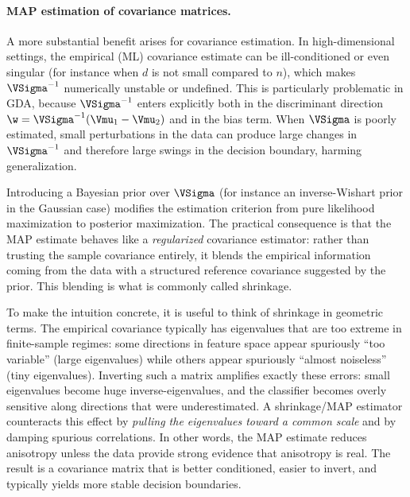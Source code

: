 \medskip
\paragraph{MAP estimation of covariance matrices.}
A more substantial benefit arises for covariance estimation. In high-dimensional settings, the empirical (ML) covariance estimate can be ill-conditioned or even singular (for instance when $d$ is not small compared to $n$), which makes $\VSigma^{-1}$ numerically unstable or undefined. This is particularly problematic in GDA, because $\VSigma^{-1}$ enters explicitly both in the discriminant direction $\w=\VSigma^{-1}(\Vmu_1-\Vmu_2)$ and in the bias term. When $\VSigma$ is poorly estimated, small perturbations in the data can produce large changes in $\VSigma^{-1}$ and therefore large swings in the decision boundary, harming generalization.

Introducing a Bayesian prior over $\VSigma$ (for instance an inverse-Wishart prior in the Gaussian case) modifies the estimation criterion from pure likelihood maximization to posterior maximization. The practical consequence is that the MAP estimate behaves like a \emph{regularized} covariance estimator: rather than trusting the sample covariance entirely, it blends the empirical information coming from the data with a structured reference covariance suggested by the prior. This blending is what is commonly called \alert{shrinkage}.

To make the intuition concrete, it is useful to think of shrinkage in geometric terms. The empirical covariance typically has eigenvalues that are too extreme in finite-sample regimes: some directions in feature space appear spuriously ``too variable'' (large eigenvalues) while others appear spuriously ``almost noiseless'' (tiny eigenvalues). Inverting such a matrix amplifies exactly these errors: small eigenvalues become huge inverse-eigenvalues, and the classifier becomes overly sensitive along directions that were underestimated. A shrinkage/MAP estimator counteracts this effect by \emph{pulling the eigenvalues toward a common scale} and by damping spurious correlations. In other words, the MAP estimate reduces anisotropy unless the data provide strong evidence that anisotropy is real. The result is a covariance matrix that is better conditioned, easier to invert, and typically yields more stable decision boundaries.

